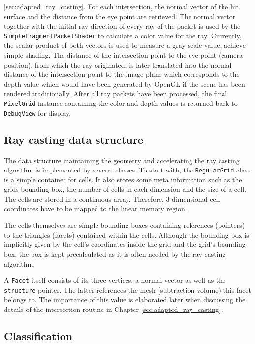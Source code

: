 \ref{sec:adapted_ray_casting}. For each intersection, the normal vector of the hit surface and the distance from the eye point are retrieved. The normal vector together with the initial ray direction of every ray of the packet is used by the \lstinline!SimpleFragmentPacketShader! to calculate a color value for the ray. Currently, the scalar product of both vectors is used to measure a gray scale value, achieve simple shading. The distance of the intersection point to the eye point (camera position), from which the ray originated, is later translated into the normal distance of the intersection point to the image plane which corresponds to the depth value which would have been generated by OpenGL if the scene has been rendered traditionally. After all ray packets have been processed, the final \lstinline!PixelGrid! instance containing the color and depth values is returned back to \lstinline!DebugView! for display.

\subsection{Ray casting data structure}
\label{sec:data_structure}

The data structure maintaining the geometry and accelerating the ray casting algorithm is implemented by several classes. To start with, the \lstinline!RegularGrid! class is a simple container for cells. It also stores some meta information such as the grids bounding box, the number of cells in each dimension and the size of a cell. The cells are stored in a continuous array. Therefore, 3-dimensional cell coordinates have to be mapped to the linear memory region.

The cells themselves are simple bounding boxes containing references (pointers) to the triangles (facets) contained within the cells. Although the bounding box is implicitly given by the cell's coordinates inside the grid and the grid's bounding box, the box is kept precalculated as it is often needed by the ray casting algorithm. 

A \lstinline!Facet! itself consists of its three vertices, a normal vector as well as the \lstinline!structure! pointer. The latter references the mesh (subtraction volume) this facet belongs to. The importance of this value is elaborated later when discussing the details of the intersection routine in Chapter \ref{sec:adapted_ray_casting}.

\subsection{Classification}
\label{sec:classification}


